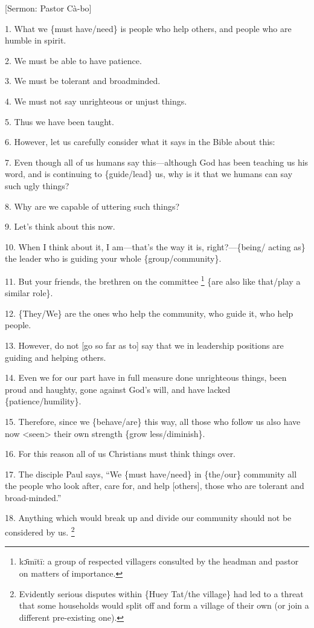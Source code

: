 
[Sermon: Pastor Cà-bo]

1. What we \{must have/need\} is people who help others, and people who are humble
in spirit.

2. We must be able to have patience.

3. We must be tolerant and broadminded.

4. We must not say unrighteous or unjust things.

5. Thus we have been taught.

6. However, let us carefully consider what it says in the Bible about this:

7. Even though all of us humans say this---although God has been teaching us his
word, and is continuing to \{guide/lead\} us, why is it that we humans can say
such ugly things?

8. Why are we capable of uttering such things?

9. Let's think about this now.

10. When I think about it, I am---that's the way it is, right?---\{being/ acting
as\} the leader who is guiding your whole \{group/community\}.

11. But your friends, the brethren on the committee \footnote{kɔ̄mītī: a group of respected villagers consulted by the headman and pastor on matters of importance.} \{are also like that/play
a similar role\}.

12. \{They/We\} are the ones who help the community, who guide it, who help people.

13. However, do not [go so far as to] say that we in leadership positions are guiding
and helping others.

14. Even we for our part have in full measure done unrighteous things, been proud
and haughty, gone against God's will, and have lacked \{patience/humility\}.

15. Therefore, since we \{behave/are\} this way, all those who follow us also have
now <seen> their own strength \{grow less/diminish\}.

16. For this reason all of us Christians must think things over.

17. The disciple Paul says, ``We \{must have/need\} in \{the/our\} community all
the people who look after, care for, and help [others], those who are tolerant
and broad-minded.''

18. Anything which would break up and divide our community should not be considered
by us. \footnote{Evidently serious disputes within \{Huey Tat/the village\} had led to a threat that some households would split off and form a village of their own (or join a different pre-existing one).}

